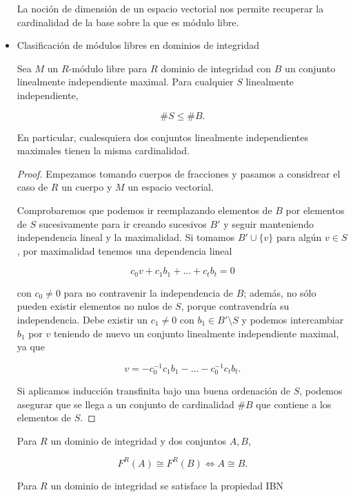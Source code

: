\documentclass[11pt]{article}
\begin{document}
\begin{itemize}
La noción de dimensión de un espacio vectorial nos permite recuperar
la cardinalidad de la base sobre la que es módulo libre.

\item Clasificación de módulos libres en dominios de integridad
\label{sec-7-5-3-4}
\begin{theorem}
Sea $M$ un $R\text{-módulo}$ libre para $R$ dominio de integridad con
$B$ un conjunto linealmente independiente maximal. Para cualquier $S$
linealmente independiente,

\[ \# S \leq \# B.
\]

En particular, cualesquiera dos conjuntos linealmente independientes
maximales tienen la misma cardinalidad.
\end{theorem}

\begin{proof}
Empezamos tomando cuerpos de fracciones y pasamos a considrear el caso
de $R$ un cuerpo y $M$ un espacio vectorial.

Comprobaremos que podemos ir reemplazando elementos de $B$ por
elementos de $S$ sucesivamente para ir creando sucesivos $B'$ y
seguir manteniendo independencia lineal y la maximalidad. Si tomamos
$B' \cup \{v\}$ para algún $v \in S$, por maximalidad tenemos una
dependencia lineal

\[
c_0v + c_1b_1 + \dots + c_tb_t = 0
\]

con $c_0 \neq 0$ para no contravenir la independencia de $B$; además, no sólo
pueden existir elementos no nulos de $S$, porque contravendría su independencia.
Debe existir un $c_1 \neq 0$ con $b_1 \in B' \setminus S$ y podemos intercambiar $b_1$ por $v$
teniendo de nuevo un conjunto linealmente independiente maximal, ya que

\[
v = -c_0^{-1}c_1b_1 - \dots - c_0^{-1}c_tb_t.
\]

Si aplicamos inducción transfinita bajo una buena ordenación de $S$, podemos
asegurar que se llega a un conjunto de cardinalidad $\#B$ que contiene a
los elementos de $S$.
\end{proof}

\begin{corollary}
Para $R$ un dominio de integridad y dos conjuntos $A,B$,

\[
F^R(A) \cong F^R(B) \iff A \cong B.
\]
\end{corollary}

\begin{corollary}
Para $R$ un dominio de integridad se satisface la propiedad IBN


\end{corollary}
\end{itemize}
\end{document}
